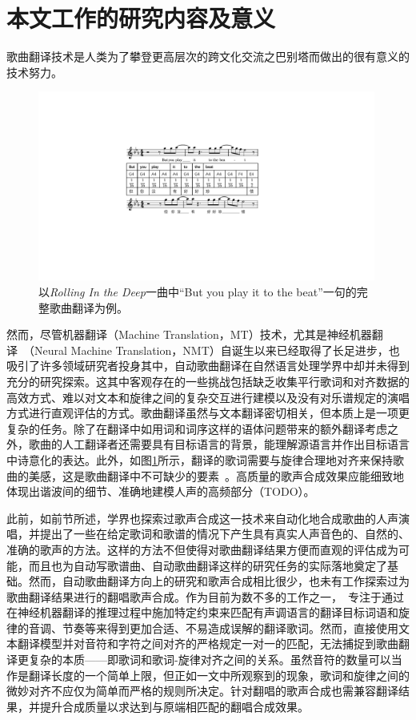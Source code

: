 \section{本文工作的研究内容及意义}
歌曲翻译技术是人类为了攀登更高层次的跨文化交流之巴别塔而做出的很有意义的技术努力。
\begin{figure}[htbp]
  \includegraphics[width=0.99\textwidth]{figure/ast/exp.pdf}
  \caption{以\textit{Rolling In the Deep}一曲中``But you play it to the beat''一句的完整歌曲翻译为例。}
  \label{fig:task_exp}
\end{figure}
然而，尽管机器翻译（Machine Translation，MT）技术，尤其是神经机器翻译~\citep{nmt,vaswani2017attention,hassan2018achieving}（Neural Machine Translation，NMT）自诞生以来已经取得了长足进步，也吸引了许多领域研究者投身其中，自动歌曲翻译在自然语言处理学界中却并未得到充分的研究探索。这其中客观存在的一些挑战包括缺乏收集平行歌词和对齐数据的高效方式、难以对文本和旋律之间的复杂交互进行建模以及没有对乐谱规定的演唱方式进行直观评估的方式。歌曲翻译虽然与文本翻译密切相关，但本质上是一项更复杂的任务。除了在翻译中如用词和词序这样的语体问题带来的额外翻译考虑之外，歌曲的人工翻译者还需要具有目标语言的背景，能理解源语言并作出目标语言中诗意化的表达。此外，如图\ref{fig:task_exp}所示，翻译的歌词需要与旋律合理地对齐来保持歌曲的美感，这是歌曲翻译中不可缺少的要素~\citep{three_d_of_singability}。高质量的歌声合成效果应能细致地体现出谐波间的细节、准确地建模人声的高频部分（TODO）。

此前，如前节所述，学界也探索过歌声合成这一技术来自动化地合成歌曲的人声演唱，并提出了一些在给定歌词和歌谱的情况下产生具有真实人声音色的、自然的、准确的歌声的方法。这样的方法不但使得对歌曲翻译结果方便而直观的评估成为可能，而且也为自动写歌谱曲、自动歌曲翻译这样的研究任务的实际落地奠定了基础。然而，自动歌曲翻译方向上的研究和歌声合成相比很少，也未有工作探索过为歌曲翻译结果进行的翻唱歌声合成。作为目前为数不多的工作之一，~\citet{gagast}专注于通过在神经机器翻译的推理过程中施加特定约束来匹配有声调语言的翻译目标词语和旋律的音调、节奏等来得到更加合适、不易造成误解的翻译歌词。然而，\citet{gagast}直接使用文本翻译模型并对音符和字符之间对齐的严格规定一对一的匹配，无法捕捉到歌曲翻译更复杂的本质——即歌词和歌词-旋律对齐之间的关系。虽然音符的数量可以当作是翻译长度的一个简单上限，但正如\citet{interplay_lyrics_melody}一文中所观察到的现象，歌词和旋律之间的微妙对齐不应仅为简单而严格的规则所决定。针对翻唱的歌声合成也需兼容翻译结果，并提升合成质量以求达到与原端相匹配的翻唱合成效果。

